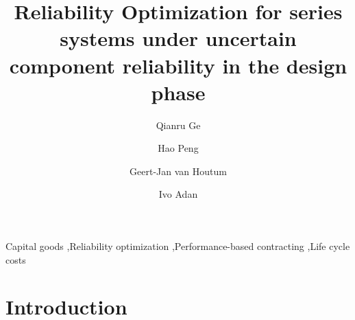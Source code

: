 \documentclass[preprint,12pt]{elsarticle}
\begin{document}
\nocite{*}

\begin{frontmatter}
\title{Reliability Optimization for series systems under uncertain component reliability in the design phase}
\author[label1]{Qianru Ge}
\author[label1]{Hao Peng}
\author[label1]{Geert-Jan van Houtum}
\author[label1]{Ivo Adan}
\address[label1]{Department of Industrial Engineering and Innovation Sciences, Eindhoven University of Technology, Eindhoven, The Netherlands}

\begin{abstract}
\end{abstract}

\begin{keyword}
Capital goods \sep Reliability optimization  \sep Performance-based contracting \sep Life cycle costs
\end{keyword}
\end{frontmatter}
\section{Introduction}
\end{document}
